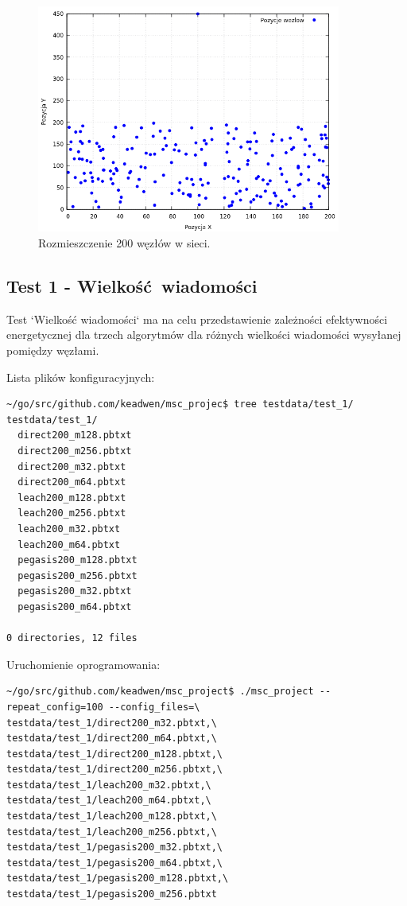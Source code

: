 \documentclass[a4paper,12pt,twoside,openany]{report}
\begin{document}
\begin{figure}[H]
 \centering
 \includegraphics[width=10cm]{images/scenariusz_lokalizacja.png}
 \caption{Rozmieszczenie 200 węzłów w sieci.}
\end{figure}

\subsection{Test 1 - Wielkość wiadomości}

Test `Wielkość wiadomości` ma na celu przedstawienie zależności efektywności energetycznej dla trzech algorytmów dla różnych wielkości wiadomości wysyłanej pomiędzy węzłami.

Lista plików konfiguracyjnych:

\begin{lstlisting}
~/go/src/github.com/keadwen/msc_projec$ tree testdata/test_1/
testdata/test_1/
  direct200_m128.pbtxt
  direct200_m256.pbtxt
  direct200_m32.pbtxt
  direct200_m64.pbtxt
  leach200_m128.pbtxt
  leach200_m256.pbtxt
  leach200_m32.pbtxt
  leach200_m64.pbtxt
  pegasis200_m128.pbtxt
  pegasis200_m256.pbtxt
  pegasis200_m32.pbtxt
  pegasis200_m64.pbtxt

0 directories, 12 files
\end{lstlisting}


Uruchomienie oprogramowania:

\begin{lstlisting}
~/go/src/github.com/keadwen/msc_project$ ./msc_project --repeat_config=100 --config_files=\
testdata/test_1/direct200_m32.pbtxt,\
testdata/test_1/direct200_m64.pbtxt,\
testdata/test_1/direct200_m128.pbtxt,\
testdata/test_1/direct200_m256.pbtxt,\
testdata/test_1/leach200_m32.pbtxt,\
testdata/test_1/leach200_m64.pbtxt,\
testdata/test_1/leach200_m128.pbtxt,\
testdata/test_1/leach200_m256.pbtxt,\
testdata/test_1/pegasis200_m32.pbtxt,\
testdata/test_1/pegasis200_m64.pbtxt,\
testdata/test_1/pegasis200_m128.pbtxt,\
testdata/test_1/pegasis200_m256.pbtxt
\end{lstlisting}
\end{document}

